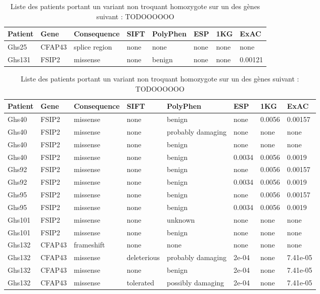 \documentclass[12pt,twoside]{reedthesis}
\theoremstyle{definition}
\theoremstyle{definition}
\theoremstyle{remark}
\begin{document}
  \begin{longtable}[t]{llllllll}
  \caption{\label{tab:tabgrp2moderate}Liste des patients portant un variant non troquant homozygote sur un des gènes suivant : TODOOOOOO}\\
  \toprule
  Patient & Gene & Consequence & SIFT & PolyPhen & ESP & 1KG & ExAC\\
  \midrule
  Ghs25 & CFAP43 & splice region & none & none & none & none & none\\
  Ghs131 & FSIP2 & missense & none & benign & none & none & 0.00121\\
  \bottomrule
  \end{longtable}
  
  \begin{longtable}[t]{llllllll}
  \caption{\label{tab:tabgrp2low}Liste des patients portant un variant non troquant homozygote sur un des gènes suivant : TODOOOOOO}\\
  \toprule
  Patient & Gene & Consequence & SIFT & PolyPhen & ESP & 1KG & ExAC\\
  \midrule
  Ghs40 & FSIP2 & missense & none & benign & none & 0.0056 & 0.00157\\
  Ghs40 & FSIP2 & missense & none & probably damaging & none & none & none\\
  Ghs40 & FSIP2 & missense & none & benign & none & none & none\\
  Ghs40 & FSIP2 & missense & none & benign & 0.0034 & 0.0056 & 0.0019\\
  Ghs92 & FSIP2 & missense & none & benign & none & 0.0056 & 0.00157\\
  \addlinespace
  Ghs92 & FSIP2 & missense & none & benign & 0.0034 & 0.0056 & 0.0019\\
  Ghs95 & FSIP2 & missense & none & benign & none & 0.0056 & 0.00157\\
  Ghs95 & FSIP2 & missense & none & benign & 0.0034 & 0.0056 & 0.0019\\
  Ghs101 & FSIP2 & missense & none & unknown & none & none & none\\
  Ghs101 & FSIP2 & missense & none & benign & none & none & none\\
  \addlinespace
  Ghs132 & CFAP43 & frameshift & none & none & none & none & none\\
  Ghs132 & CFAP43 & missense & deleterious & probably damaging & 2e-04 & none & 7.41e-05\\
  Ghs132 & CFAP43 & missense & none & benign & 2e-04 & none & 7.41e-05\\
  Ghs132 & CFAP43 & missense & tolerated & possibly damaging & 2e-04 & none & 7.41e-05\\
  \bottomrule
  \end{longtable}
  
\end{document}
